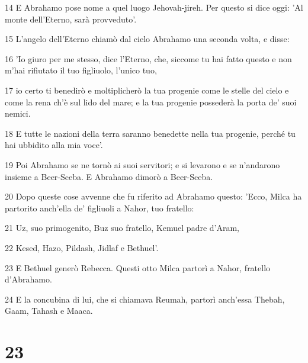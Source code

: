 \par 14 E Abrahamo pose nome a quel luogo Jehovah-jireh. Per questo si dice oggi: 'Al monte dell'Eterno, sarà provveduto'.
\par 15 L'angelo dell'Eterno chiamò dal cielo Abrahamo una seconda volta, e disse:
\par 16 'Io giuro per me stesso, dice l'Eterno, che, siccome tu hai fatto questo e non m'hai rifiutato il tuo figliuolo, l'unico tuo,
\par 17 io certo ti benedirò e moltiplicherò la tua progenie come le stelle del cielo e come la rena ch'è sul lido del mare; e la tua progenie possederà la porta de' suoi nemici.
\par 18 E tutte le nazioni della terra saranno benedette nella tua progenie, perché tu hai ubbidito alla mia voce'.
\par 19 Poi Abrahamo se ne tornò ai suoi servitori; e si levarono e se n'andarono insieme a Beer-Sceba. E Abrahamo dimorò a Beer-Sceba.
\par 20 Dopo queste cose avvenne che fu riferito ad Abrahamo questo: 'Ecco, Milca ha partorito anch'ella de' figliuoli a Nahor, tuo fratello:
\par 21 Uz, suo primogenito, Buz suo fratello, Kemuel padre d'Aram,
\par 22 Kesed, Hazo, Pildash, Jidlaf e Bethuel'.
\par 23 E Bethuel generò Rebecca. Questi otto Milca partorì a Nahor, fratello d'Abrahamo.
\par 24 E la concubina di lui, che si chiamava Reumah, partorì anch'essa Thebah, Gaam, Tahash e Maaca.

\chapter{23}

